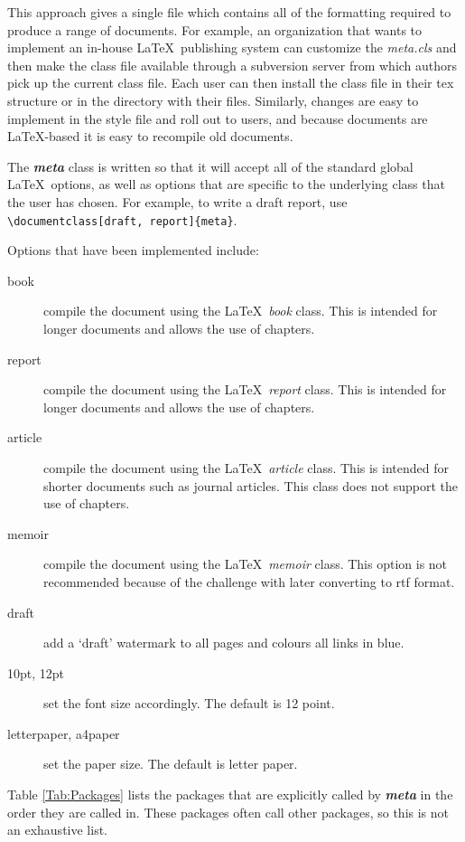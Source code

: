 \documentclass[12pt,letterpaper]{article}
\newcommand{\fn}[1]{\emph{#1}}
\newcommand{\packagename}[1]{\textbf{\emph{#1}}}
\begin{document}
This approach gives a single file which contains all of the formatting required to produce a range of documents. For example, an organization that wants to implement an in-house \LaTeX\ publishing system can customize the \fn{meta.cls} and then make the class file available through a subversion server from which authors pick up the current class file. Each user can then install the class file in their tex structure or in the directory with their files. Similarly, changes are easy to implement in the style file and roll out to users, and because documents are \LaTeX-based it is easy to recompile old documents.

The \packagename{meta} class is written so that it will accept all of the standard global \LaTeX\ options, as well as options that are specific to the underlying class that the user has chosen. For example, to write a draft report, use \verb+\documentclass[draft, report]{meta}+.

Options that have been implemented include:
\begin{description}
\item[book]{compile the document using the \LaTeX\ \emph{book} class. This is intended for longer documents and allows the use of chapters.}
\item[report]{compile the document using the \LaTeX\ \emph{report} class. This is intended for longer documents and allows the use of chapters.}
\item[article]{compile the document using the \LaTeX\ \emph{article} class. This is intended for shorter documents such as journal articles. This class does not support the use of chapters.}
\item[memoir]{compile the document using the \LaTeX\ \emph{memoir} class. This option is not recommended because of the challenge with later converting to rtf format.}
\item[draft]{add a `draft' watermark to all pages and colours all links in blue.}
\item[10pt, 12pt]{set the font size accordingly. The default is 12 point.}
\item[letterpaper, a4paper]{set the paper size. The default is letter paper.}
\end{description}

Table \ref{Tab:Packages} lists the packages that are explicitly called by \packagename{meta} in the order they are called in. These packages often call other packages, so this is not an exhaustive list.
\end{document}
